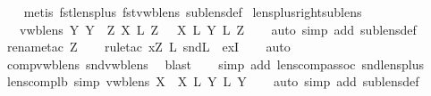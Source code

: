 \begin{isabellebody}
%
\isadelimproof
\ \ %
\endisadelimproof
%
\isatagproof
{}\isamarkupfalse%
\ {\isacharparenleft}metis\ fst{\isacharunderscore}lens{\isacharunderscore}plus\ fst{\isacharunderscore}vwb{\isacharunderscore}lens\ sublens{\isacharunderscore}def{\isacharparenright}%
\endisatagproof
{\isafoldproof}%
%
\isadelimproof
\isanewline
%
\endisadelimproof
\isanewline
{}\isamarkupfalse%
\ lens{\isacharunderscore}plus{\isacharunderscore}right{\isacharunderscore}sublens{\isacharcolon}\isanewline
\ \ {\isachardoublequoteopen}{\isasymlbrakk}\ vwb{\isacharunderscore}lens\ Y{\isacharsemicolon}\ Y\ {\isasymbowtie}\ Z{\isacharsemicolon}\ X\ {\isasymsubseteq}\isactrlsub L\ Z\ {\isasymrbrakk}\ {\isasymLongrightarrow}\ X\ {\isasymsubseteq}\isactrlsub L\ Y\ {\isacharplus}\isactrlsub L\ Z{\isachardoublequoteclose}\isanewline
%
\isadelimproof
\ \ %
\endisadelimproof
%
\isatagproof
{}\isamarkupfalse%
\ {\isacharparenleft}auto\ simp\ add{\isacharcolon}\ sublens{\isacharunderscore}def{\isacharparenright}\isanewline
\ \ \isamarkupfalse%
\ {\isacharparenleft}rename{\isacharunderscore}tac\ Z{\isacharprime}{\isacharparenright}\isanewline
\ \ \isamarkupfalse%
\ {\isacharparenleft}rule{\isacharunderscore}tac\ x{\isacharequal}{\isachardoublequoteopen}Z{\isacharprime}\ {\isacharsemicolon}\isactrlsub L\ snd\isactrlsub L{\isachardoublequoteclose}\ \ exI{\isacharparenright}\isanewline
\ \ \isamarkupfalse%
\ {\isacharparenleft}auto{\isacharparenright}\isanewline
\ \ \isamarkupfalse%
\ comp{\isacharunderscore}vwb{\isacharunderscore}lens\ snd{\isacharunderscore}vwb{\isacharunderscore}lens\ \isamarkupfalse%
\ blast\isanewline
\ \ \isamarkupfalse%
\ {\isacharparenleft}simp\ add{\isacharcolon}\ lens{\isacharunderscore}comp{\isacharunderscore}assoc\ snd{\isacharunderscore}lens{\isacharunderscore}plus{\isacharparenright}\isanewline
{}\isamarkupfalse%
%
\endisatagproof
{\isafoldproof}%
%
\isadelimproof
\isanewline
%
\endisadelimproof
\isanewline
{}\isamarkupfalse%
\ lens{\isacharunderscore}comp{\isacharunderscore}lb\ {\isacharbrackleft}simp{\isacharbrackright}{\isacharcolon}\ {\isachardoublequoteopen}vwb{\isacharunderscore}lens\ X\ {\isasymLongrightarrow}\ X\ {\isacharsemicolon}\isactrlsub L\ Y\ {\isasymsubseteq}\isactrlsub L\ Y{\isachardoublequoteclose}\isanewline
%
\isadelimproof
\ \ %
\endisadelimproof
%
\isatagproof
{}\isamarkupfalse%
\ {\isacharparenleft}auto\ simp\ add{\isacharcolon}\ sublens{\isacharunderscore}def{\isacharparenright}%

\end{isabellebody}
